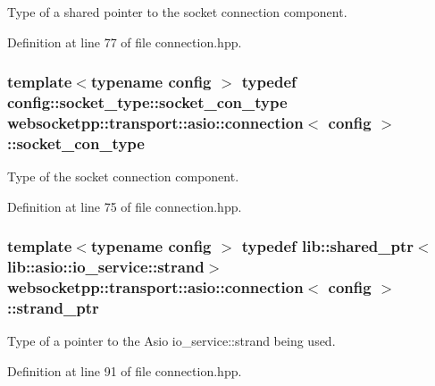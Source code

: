 Type of a shared pointer to the socket connection component. 



Definition at line 77 of file connection.\+hpp.

\hypertarget{classwebsocketpp_1_1transport_1_1asio_1_1connection_a85712056cec173324f790a92a0d94021}{}
\subsubsection[{socket\+\_\+con\+\_\+type}]{\setlength{\rightskip}{0pt plus 5cm}template$<$typename config $>$ typedef config\+::socket\+\_\+type\+::socket\+\_\+con\+\_\+type {\bf websocketpp\+::transport\+::asio\+::connection}$<$ config $>$\+::{\bf socket\+\_\+con\+\_\+type}}\label{classwebsocketpp_1_1transport_1_1asio_1_1connection_a85712056cec173324f790a92a0d94021}


Type of the socket connection component. 



Definition at line 75 of file connection.\+hpp.

\hypertarget{classwebsocketpp_1_1transport_1_1asio_1_1connection_ad960008bc6449e5c74e041d21a5c05e4}{}
\subsubsection[{strand\+\_\+ptr}]{\setlength{\rightskip}{0pt plus 5cm}template$<$typename config $>$ typedef lib\+::shared\+\_\+ptr$<$lib\+::asio\+::io\+\_\+service\+::strand$>$ {\bf websocketpp\+::transport\+::asio\+::connection}$<$ config $>$\+::{\bf strand\+\_\+ptr}}\label{classwebsocketpp_1_1transport_1_1asio_1_1connection_ad960008bc6449e5c74e041d21a5c05e4}


Type of a pointer to the Asio io\+\_\+service\+::strand being used. 



Definition at line 91 of file connection.\+hpp.

